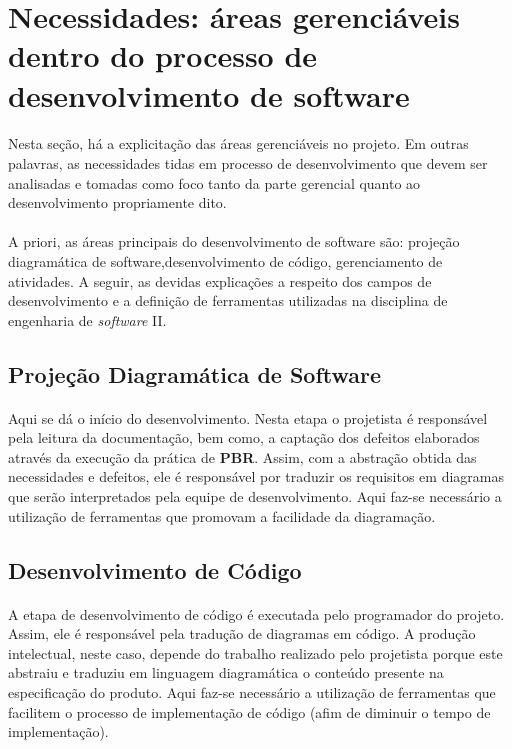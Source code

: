 \documentclass[12pt,a4paper]{article}
\begin{document}
	\paragraph{}
	\section{Necessidades: áreas gerenciáveis dentro do processo de desenvolvimento de software}
	\paragraph{} Nesta seção, há a explicitação das áreas gerenciáveis no projeto. Em outras palavras, as necessidades tidas em processo de desenvolvimento que devem ser analisadas e tomadas como foco tanto da parte gerencial quanto ao desenvolvimento propriamente dito.
	\paragraph{} A priori, as áreas principais do desenvolvimento de software são: projeção diagramática de software,desenvolvimento de código, gerenciamento de atividades. A seguir, as devidas explicações a respeito dos campos de desenvolvimento e a definição de ferramentas utilizadas na disciplina de engenharia de \textit{software} II.
	\subsection{Projeção Diagramática de Software}
	\paragraph{} Aqui se dá o início do desenvolvimento. Nesta etapa o projetista é responsável pela leitura da documentação, bem como, a captação dos defeitos elaborados através da execução da prática de \textbf{PBR}. Assim, com a abstração obtida das necessidades e defeitos, ele é responsável por traduzir os requisitos em diagramas que serão interpretados pela equipe de desenvolvimento. Aqui faz-se necessário a utilização de ferramentas que promovam a facilidade  da diagramação.
	\subsection{Desenvolvimento de Código}
	\paragraph{}A etapa de desenvolvimento de código é executada pelo programador do projeto. Assim, ele é responsável pela tradução de diagramas em código. A produção intelectual, neste caso, depende do trabalho realizado pelo projetista porque este abstraiu e traduziu em linguagem diagramática o conteúdo presente na especificação do produto. Aqui faz-se necessário a utilização de ferramentas que facilitem o processo de implementação de código (afim de diminuir o tempo de implementação).
\end{document}
